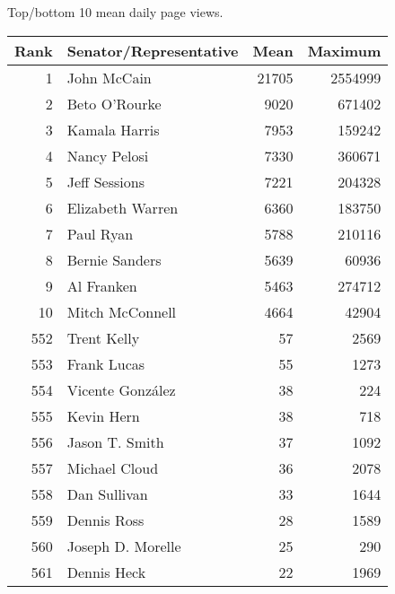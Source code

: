 \centering
\caption{Top/bottom 10 mean daily page views.\label{tab:pageviewstopusa}} 
\begingroup\small
\begin{tabular}{rlrr}
  \toprule
Rank & Senator/Representative & Mean & Maximum \\ 
  \midrule
1 & John McCain & 21705 & 2554999 \\ 
  2 & Beto O'Rourke & 9020 & 671402 \\ 
  3 & Kamala Harris & 7953 & 159242 \\ 
  4 & Nancy Pelosi & 7330 & 360671 \\ 
  5 & Jeff Sessions & 7221 & 204328 \\ 
   \midrule
6 & Elizabeth Warren & 6360 & 183750 \\ 
  7 & Paul Ryan & 5788 & 210116 \\ 
  8 & Bernie Sanders & 5639 & 60936 \\ 
  9 & Al Franken & 5463 & 274712 \\ 
  10 & Mitch McConnell & 4664 & 42904 \\ 
   \midrule
552 & Trent Kelly & 57 & 2569 \\ 
  553 & Frank Lucas & 55 & 1273 \\ 
  554 & Vicente González & 38 & 224 \\ 
  555 & Kevin Hern & 38 & 718 \\ 
  556 & Jason T. Smith & 37 & 1092 \\ 
   \midrule
557 & Michael Cloud & 36 & 2078 \\ 
  558 & Dan Sullivan & 33 & 1644 \\ 
  559 & Dennis Ross & 28 & 1589 \\ 
  560 & Joseph D. Morelle & 25 & 290 \\ 
  561 & Dennis Heck & 22 & 1969 \\ 
   \bottomrule
\end{tabular}
\endgroup

